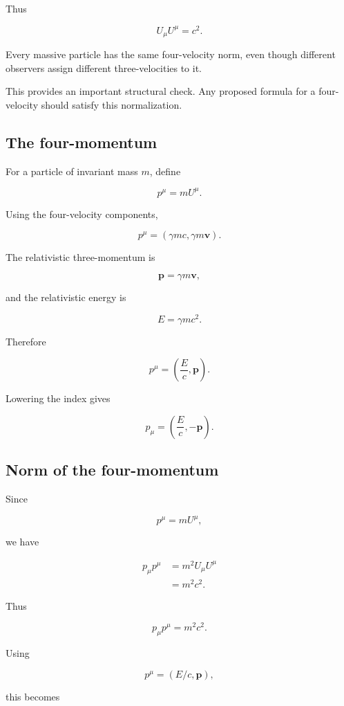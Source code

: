 Thus

\[
\boxed{
U_{\mu}U^{\mu}=c^{2}
}.
\]

Every massive particle has the same four-velocity norm, even though different observers assign different three-velocities to it.

This provides an important structural check. Any proposed formula for a four-velocity should satisfy this normalization.

\subsection{The four-momentum}

For a particle of invariant mass \(m\), define

\[
\boxed{
p^{\mu}=mU^{\mu}
}.
\]

Using the four-velocity components,

\[
p^{\mu}
=
(\gamma mc,\gamma m\mathbf{v}).
\]

The relativistic three-momentum is

\[
\mathbf{p}
=
\gamma m\mathbf{v},
\]

and the relativistic energy is

\[
E
=
\gamma mc^{2}.
\]

Therefore

\[
\boxed{
p^{\mu}
=
\left(
\frac{E}{c},
\mathbf{p}
\right)
}.
\]

Lowering the index gives

\[
\boxed{
p_{\mu}
=
\left(
\frac{E}{c},
-\mathbf{p}
\right)
}.
\]

\subsection{Norm of the four-momentum}

Since

\[
p^{\mu}=mU^{\mu},
\]

we have

\[
\begin{aligned}
p_{\mu}p^{\mu}
&=
m^{2}U_{\mu}U^{\mu}\\
&=
m^{2}c^{2}.
\end{aligned}
\]

Thus

\[
\boxed{
p_{\mu}p^{\mu}=m^{2}c^{2}
}.
\]

Using

\[
p^{\mu}=\left(E/c,\mathbf{p}\right),
\]

this becomes

